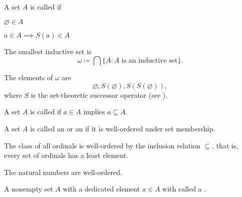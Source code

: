 \begin{definition}\label{def:inductive_set}\cite[68]{Enderton1977}
  A set \( A \) is called  if
  \begin{defenum}
    \item \( \varnothing \in A \)
    \item \( a \in A \implies S(a) \in A \)
  \end{defenum}
\end{definition}

\begin{definition}\label{def:smallest_inductive_set}
  The smallest inductive set is
  \begin{equation*}
    \omega \coloneqq \bigcap \{ A \colon A \text{ is an inductive set} \}.
  \end{equation*}

  The elements of \( \omega \) are
  \begin{equation*}
    \varnothing, S(\varnothing), S(S(\varnothing)),
  \end{equation*}
  where \( S \) is the set-theoretic successor operator (see ).
\end{definition}

\begin{definition}\label{def:transitive_set}\cite[71]{Enderton1977}
  A set \( A \) is called  if \( a \in A \) implies \( a \subseteq A \).
\end{definition}

\begin{definition}\label{def:ordinal}\cite[theorem 7L]{Enderton1977}
  A set \( A \) is called an  or an  if it is well-ordered under set membership.
\end{definition}

\begin{theorem}\label{thm:ordinals_are_well_ordered}\cite[theorem 7M]{Enderton1977}
  The class of all ordinals is well-ordered by the inclusion relation \( \subseteq \), that is, every set of ordinals has a least element.
\end{theorem}

\begin{corollary}\label{thm:natural_numbers_are_well_ordered}
  The natural numbers are well-ordered.
\end{corollary}

\begin{definition}\label{def:pointed_set}
  A nonempty set \( A \) with a dedicated element \( x \in A \) with called a .
\end{definition}
